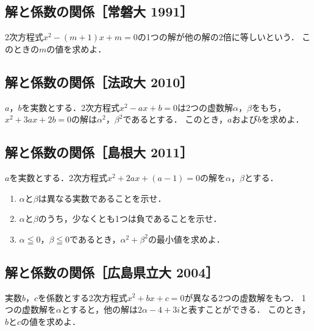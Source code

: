\documentclass[../all/math-standard_questions_all.tex]{subfiles}
\begin{document}
\vspace{2cm}
\vfill

\subsection{解と係数の関係［常磐大 1991］}

2次方程式$x^2-(m+1)x+m=0$の1つの解が他の解の2倍に等しいという．
このときの$m$の値を求めよ．

\vspace{2cm}
\vfill

\subsection{解と係数の関係［法政大 2010］}

$a$，$b$を実数とする．2次方程式$x^2-ax+b=0$は2つの虚数解$\alpha$，$\beta$をもち，
$x^2+3ax+2b=0$の解は$\alpha^2$，$\beta^2$であるとする．
このとき，$a$および$b$を求めよ．

\vspace{2cm}
\vfill

\subsection{解と係数の関係［島根大 2011］}

$a$を実数とする．2次方程式$x^2+2ax+(a-1)=0$の解を$\alpha$，$\beta$とする．

\begin{enumerate}
    \item $\alpha$と$\beta$は異なる実数であることを示せ．
    \item $\alpha$と$\beta$のうち，少なくとも1つは負であることを示せ．
    \item $\alpha\leqq0$，$\beta\leqq0$であるとき，$\alpha^2+\beta^2$の最小値を求めよ．
\end{enumerate}

\vspace{2cm}
\vfill

\subsection{解と係数の関係［広島県立大 2004］}

実数$b$，$c$を係数とする2次方程式$x^2+bx+c=0$が異なる2つの虚数解をもつ．
1つの虚数解を$\alpha$とすると，他の解は$2\alpha-4+3i$と表すことができる．
このとき，$b$と$c$の値を求めよ．

\vspace{2cm}
\vfill
\end{document}
